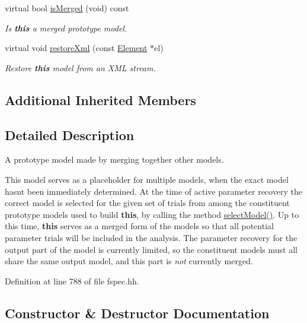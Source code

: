 \begin{DoxyCompactItemize}
virtual bool \mbox{\hyperlink{class_proto_model_merged_aea3dceb1497499800015607bbfd2d863}{is\+Merged}} (void) const
\begin{DoxyCompactList}\small\item\em Is {\bfseries{this}} a merged prototype model. \end{DoxyCompactList}\item 
virtual void \mbox{\hyperlink{class_proto_model_merged_a1c80c617c086b0edacb483f8315d12e9}{restore\+Xml}} (const \mbox{\hyperlink{class_element}{Element}} $\ast$el)
\begin{DoxyCompactList}\small\item\em Restore {\bfseries{this}} model from an X\+ML stream. \end{DoxyCompactList}\end{DoxyCompactItemize}
\subsection*{Additional Inherited Members}


\subsection{Detailed Description}
A prototype model made by merging together other models. 

This model serves as a placeholder for multiple models, when the exact model hasn\textquotesingle{}t been immediately determined. At the time of active parameter recovery the correct model is selected for the given set of trials from among the constituent prototype models used to build {\bfseries{this}}, by calling the method \mbox{\hyperlink{class_proto_model_merged_a3679cbe7a72e251e72d9b7140c0fac40}{select\+Model()}}. Up to this time, {\bfseries{this}} serves as a merged form of the models so that all potential parameter trials will be included in the analysis. The parameter recovery for the output part of the model is currently limited, so the constituent models must all share the same output model, and this part is {\itshape not} currently merged. 

Definition at line 788 of file fspec.\+hh.



\subsection{Constructor \& Destructor Documentation}
\mbox{\label{class_proto_model_merged_a89ae5cb14a23eedeba04de6475d46f70}} 
